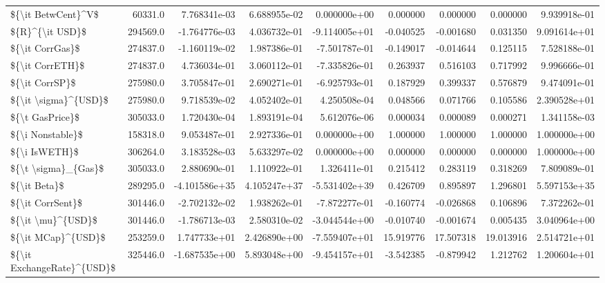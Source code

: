 \begin{tabular}{lrrrrrrrr}
\$\{\textbackslash it BetwCent\}\textasciicircum V\$         &   60331.0 &   7.768341e-03 &  6.688955e-02 &  0.000000e+00 &   0.000000 &   0.000000 &   0.000000 &   9.939918e-01 \\
\$\{R\}\textasciicircum \{\textbackslash it USD\}\$            &  294569.0 &  -1.764776e-03 &  4.036732e-01 & -9.114005e+01 &  -0.040525 &  -0.001680 &   0.031350 &   9.091614e+01 \\
\$\{\textbackslash it CorrGas\}\$            &  274837.0 &  -1.160119e-02 &  1.987386e-01 & -7.501787e-01 &  -0.149017 &  -0.014644 &   0.125115 &   7.528188e-01 \\
\$\{\textbackslash it CorrETH\}\$            &  274837.0 &   4.736034e-01 &  3.060112e-01 & -7.335826e-01 &   0.263937 &   0.516103 &   0.717992 &   9.996666e-01 \\
\$\{\textbackslash it CorrSP\}\$             &  275980.0 &   3.705847e-01 &  2.690271e-01 & -6.925793e-01 &   0.187929 &   0.399337 &   0.576879 &   9.474091e-01 \\
\$\{\textbackslash it \textbackslash sigma\}\textasciicircum \{USD\}\$       &  275980.0 &   9.718539e-02 &  4.052402e-01 &  4.250508e-04 &   0.048566 &   0.071766 &   0.105586 &   2.390528e+01 \\
\$\{\textbackslash t GasPrice\}\$            &  305033.0 &   1.720430e-04 &  1.893191e-04 &  5.612076e-06 &   0.000034 &   0.000089 &   0.000271 &   1.341158e-03 \\
\$\{\textbackslash i Nonstable\}\$           &  158318.0 &   9.053487e-01 &  2.927336e-01 &  0.000000e+00 &   1.000000 &   1.000000 &   1.000000 &   1.000000e+00 \\
\$\{\textbackslash i IsWETH\}\$              &  306264.0 &   3.183528e-03 &  5.633297e-02 &  0.000000e+00 &   0.000000 &   0.000000 &   0.000000 &   1.000000e+00 \\
\$\{\textbackslash t \textbackslash sigma\}\_\{Gas\}\$        &  305033.0 &   2.880690e-01 &  1.110922e-01 &  1.326411e-01 &   0.215412 &   0.283119 &   0.318269 &   7.809089e-01 \\
\$\{\textbackslash it Beta\}\$               &  289295.0 &  -4.101586e+35 &  4.105247e+37 & -5.531402e+39 &   0.426709 &   0.895897 &   1.296801 &   5.597153e+35 \\
\$\{\textbackslash it CorrSent\}\$           &  301446.0 &  -2.702132e-02 &  1.938262e-01 & -7.872277e-01 &  -0.160774 &  -0.026868 &   0.106896 &   7.372262e-01 \\
\$\{\textbackslash it \textbackslash mu\}\textasciicircum \{USD\}\$          &  301446.0 &  -1.786713e-03 &  2.580310e-02 & -3.044544e+00 &  -0.010740 &  -0.001674 &   0.005435 &   3.040964e+00 \\
\$\{\textbackslash it MCap\}\textasciicircum \{USD\}\$         &  253259.0 &   1.747733e+01 &  2.426890e+00 & -7.559407e+01 &  15.919776 &  17.507318 &  19.013916 &   2.514721e+01 \\
\$\{\textbackslash it ExchangeRate\}\textasciicircum \{USD\}\$ &  325446.0 &  -1.687535e+00 &  5.893048e+00 & -9.454157e+01 &  -3.542385 &  -0.879942 &   1.212762 &   1.200604e+01 \\
\bottomrule
\end{tabular}
